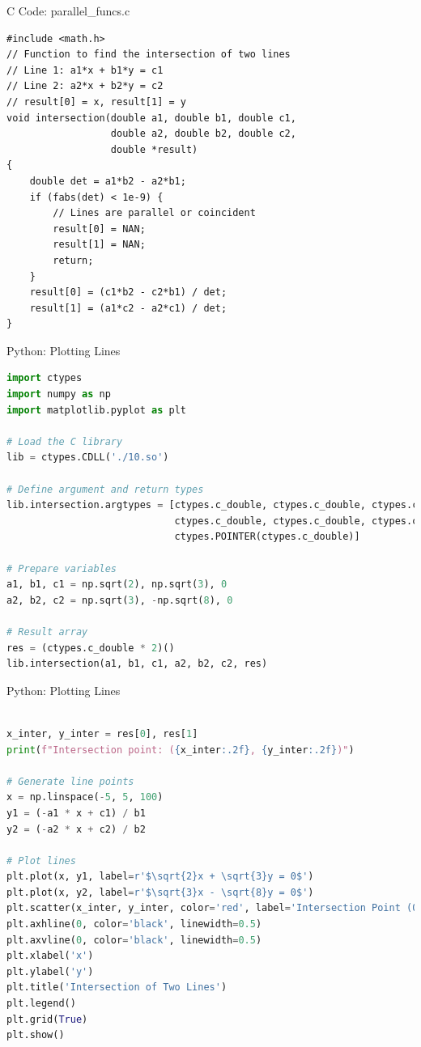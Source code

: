 \documentclass{beamer}
\begin{document}
\begin{frame}[fragile]{C Code: parallel\_funcs.c}
\begin{lstlisting}
#include <math.h>
// Function to find the intersection of two lines
// Line 1: a1*x + b1*y = c1
// Line 2: a2*x + b2*y = c2
// result[0] = x, result[1] = y
void intersection(double a1, double b1, double c1,
                  double a2, double b2, double c2,
                  double *result)
{
    double det = a1*b2 - a2*b1;
    if (fabs(det) < 1e-9) {
        // Lines are parallel or coincident
        result[0] = NAN;
        result[1] = NAN;
        return;
    }
    result[0] = (c1*b2 - c2*b1) / det;
    result[1] = (a1*c2 - a2*c1) / det;
}
\end{lstlisting}
\end{frame}

\begin{frame}[fragile]{Python: Plotting Lines}
\begin{lstlisting}[language=Python, basicstyle=\ttfamily\scriptsize, keywordstyle=\color{blue}]
import ctypes
import numpy as np
import matplotlib.pyplot as plt

# Load the C library
lib = ctypes.CDLL('./10.so')

# Define argument and return types
lib.intersection.argtypes = [ctypes.c_double, ctypes.c_double, ctypes.c_double,
                             ctypes.c_double, ctypes.c_double, ctypes.c_double,
                             ctypes.POINTER(ctypes.c_double)]

# Prepare variables
a1, b1, c1 = np.sqrt(2), np.sqrt(3), 0
a2, b2, c2 = np.sqrt(3), -np.sqrt(8), 0

# Result array
res = (ctypes.c_double * 2)()
lib.intersection(a1, b1, c1, a2, b2, c2, res)
\end{lstlisting}
\end{frame}

\begin{frame}[fragile]{Python: Plotting Lines}
\begin{lstlisting}[language=Python, basicstyle=\ttfamily\scriptsize, keywordstyle=\color{blue}]

x_inter, y_inter = res[0], res[1]
print(f"Intersection point: ({x_inter:.2f}, {y_inter:.2f})")

# Generate line points
x = np.linspace(-5, 5, 100)
y1 = (-a1 * x + c1) / b1
y2 = (-a2 * x + c2) / b2

# Plot lines
plt.plot(x, y1, label=r'$\sqrt{2}x + \sqrt{3}y = 0$')
plt.plot(x, y2, label=r'$\sqrt{3}x - \sqrt{8}y = 0$')
plt.scatter(x_inter, y_inter, color='red', label='Intersection Point (0,0)')
plt.axhline(0, color='black', linewidth=0.5)
plt.axvline(0, color='black', linewidth=0.5)
plt.xlabel('x')
plt.ylabel('y')
plt.title('Intersection of Two Lines')
plt.legend()
plt.grid(True)
plt.show()
\end{lstlisting}
\end{frame}
\end{document}
